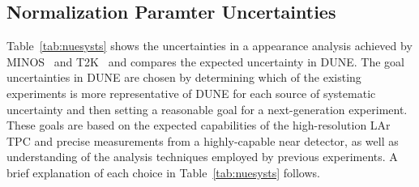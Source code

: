 \subsection{Normalization Paramter Uncertainties}

Table~\ref{tab:nuesysts} shows the uncertainties in a \nue appearance analysis achieved by MINOS~\cite{Adamson:2013ue}
and T2K~\cite{Abe:2015awa} and compares the expected uncertainty in
DUNE. The goal uncertainties in DUNE are chosen by determining which
of the existing experiments is more representative of DUNE for each source
of systematic uncertainty and then setting a reasonable goal for a next-generation
experiment. These goals are based on the expected capabilities of the high-resolution
LAr TPC and  precise measurements from a highly-capable near detector, as well as
understanding of the analysis techniques employed by previous experiments.
A brief explanation of each choice in Table~\ref{tab:nuesysts} follows.

